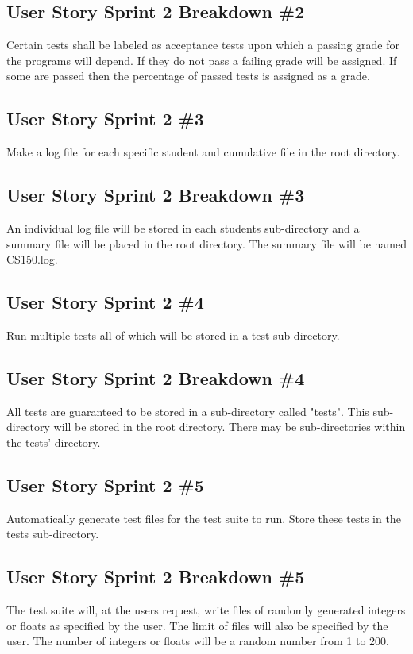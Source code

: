 \subsection{User Story Sprint 2 Breakdown \#2}
Certain tests shall be labeled as acceptance tests upon which a passing grade for the programs will depend. If they do not pass a failing grade will be assigned. If some are passed then the percentage of passed tests is assigned as a grade.

\subsection{User Story Sprint 2 \#3}
Make a log file for each specific student and cumulative file in the root directory.

\subsection{User Story Sprint 2 Breakdown \#3}
An individual log file will be stored in each students sub-directory and a summary file will be placed in the root directory. The summary file will be named CS150.log.

\subsection{User Story Sprint 2 \#4}
Run multiple tests all of which will be stored in a test sub-directory.

\subsection{User Story Sprint 2 Breakdown \#4}
All tests are guaranteed to be stored in a sub-directory called "tests".
This sub-directory will be stored in the root directory. There may be sub-directories within the tests' directory.

\subsection{User Story Sprint 2 \#5}
Automatically generate test files for the test suite to run. Store these tests in the tests sub-directory.

\subsection{User Story Sprint 2 Breakdown \#5}
The test suite will, at the users request, write files of randomly generated integers or floats as specified by the user. The limit of files will also be specified by the user. The number of integers or floats will be a random number from 1 to 200.


